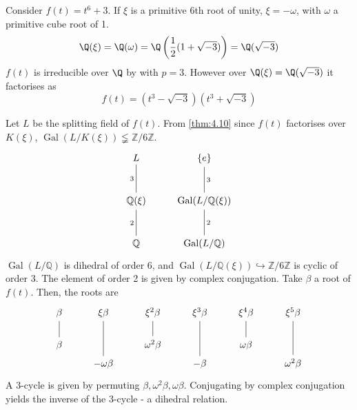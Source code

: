 \documentclass{article}
\DeclareMathOperator{\Gal}{Gal}
\begin{document}
\begin{eg}
    Consider $f(t) = t^6 + 3$.
    If $\xi$ is a primitive 6th root of unity, $\xi = -\omega$, with $\omega$ a primitive cube root of 1.
    \begin{equation*}
        \Q(\xi) = \Q(\omega) = \Q\left(\frac{1}{2}(1 + \sqrt{-3})\right) = \Q(\sqrt{-3})
    \end{equation*}
    $f(t)$ is irreducible over $\Q$ by  with $p=3$.
    However over $\Q(\xi) = \Q(\sqrt{-3})$ it factorises as
    \begin{equation*}
        f(t) = (t^3 - \sqrt{-3})(t^3 + \sqrt{-3})
    \end{equation*}

    Let $L$ be the splitting field of $f(t)$.
    From \cref{thm:4.10} since $f(t)$ factorises over $K(\xi)$, $\Gal(L/K(\xi)) \lneqq \mathbb{Z}/6\mathbb{Z}$.
    \begin{equation*}
        \begin{tikzcd}[row sep=large]
            L \arrow[d, no head, "3"'] & \{e\} \arrow[d, no head, "3"] \\
            \mathbb{Q}(\xi) \arrow[d, no head, "2"'] & \Gal(L/\mathbb{Q}(\xi)) \arrow[d, no head, "2"] \\
            \mathbb{Q} & \Gal(L/\mathbb{Q})
        \end{tikzcd}
    \end{equation*}
    $\Gal(L/\mathbb{Q})$ is dihedral of order 6, and $\Gal(L/\mathbb{Q}(\xi)) \hookrightarrow \mathbb{Z}/6\mathbb{Z}$ is cyclic of order 3.
    The element of order 2 is given by complex conjugation.
    Take $\beta$ a root of $f(t)$. Then, the roots are
    \begin{equation*}
        \begin{tikzcd}[row sep=0.2em]
            \beta \ar[dddddddd,no head]& \xi \beta  \ar[ddddddddd,no head]   & \xi^2 \beta \ar[dddddddd,no head]   & \xi^3 \beta \ar[ddddddddd,no head] & \xi^4 \beta  \ar[dddddddd,no head]& \xi^5 \beta \ar[ddddddddd,no head] \\\\\\\\\\\\\\\\
            \beta &               & \omega^2 \beta &             & \omega \beta & \\
                  & -\omega \beta &                & -\beta      &              & \omega^2 \beta
        \end{tikzcd}
    \end{equation*}
    A $3$-cycle is given by permuting $\beta, \omega^2 \beta, \omega \beta$.
    Conjugating by complex conjugation yields the inverse of the $3$-cycle - a dihedral relation.
\end{eg}
\end{document}
